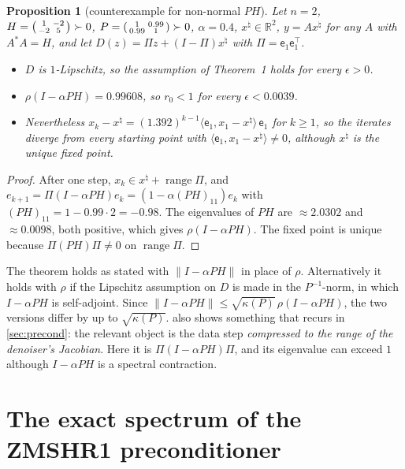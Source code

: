 \documentclass[11pt]{article}
\newtheorem{proposition}[theorem]{Proposition}
\theoremstyle{definition}
\theoremstyle{remark}
\newcommand{\RR}{\mathbb R}
\newcommand{\inner}[2]{\langle #1,#2\rangle}
\newcommand{\norm}[1]{\lVert #1\rVert}
\newcommand{\range}{\operatorname{range}}
\newcommand{\xt}{x^\natural}
\begin{document}
\begin{proposition}[counterexample for non-normal $PH$]\label{prop:counterexample}
Let $n=2$, $H=\begin{psmallmatrix}1&-2\\-2&5\end{psmallmatrix}\succ0$, $P=\begin{psmallmatrix}1&0.99\\0.99&1\end{psmallmatrix}\succ0$,
$\alpha=0.4$, $\xt\in\RR^2$, $y=A\xt$ for any $A$ with $A^*A=H$, and let $D(z)=\Pi z+(I-\Pi)\xt$ with
$\Pi=\mathsf e_1\mathsf e_1^\top$.
\begin{itemize}
\item $D$ is $1$-Lipschitz, so the assumption of Theorem~1 holds for every $\epsilon>0$.
\item $\rho(I-\alpha PH)=0.99608$, so $r_0<1$ for every $\epsilon<0.0039$.
\item Nevertheless $x_k-\xt=(1.392)^{k-1}\inner{\mathsf e_1}{x_1-\xt}\,\mathsf e_1$ for $k\geq1$, so the iterates diverge from every
  starting point with $\inner{\mathsf e_1}{x_1-\xt}\neq0$, although $\xt$ is the unique fixed point.
\end{itemize}
\end{proposition}
\begin{proof}
After one step, $x_k\in \xt+\range\Pi$, and $e_{k+1}=\Pi(I-\alpha PH)e_k=(1-\alpha(PH)_{11})e_k$ with
$(PH)_{11}=1-0.99\cdot2=-0.98$. The eigenvalues of $PH$ are $\approx2.0302$ and $\approx0.0098$, both positive,
which gives $\rho(I-\alpha PH)$. The fixed point is unique because $\Pi(PH)\Pi\neq0$ on $\range\Pi$.
\end{proof}

The theorem holds as stated with $\norm{I-\alpha PH}$ in place of $\rho$. Alternatively it holds with $\rho$ if the
Lipschitz assumption on $D$ is made in the $P^{-1}$-norm, in which $I-\alpha PH$ is self-adjoint. Since
$\norm{I-\alpha PH}\leq\sqrt{\kappa(P)}\,\rho(I-\alpha PH)$, the two versions differ by up to $\sqrt{\kappa(P)}$.
 also shows something that recurs in \cref{sec:precond}: the relevant object is the data
step \emph{compressed to the range of the denoiser's Jacobian}. Here it is $\Pi(I-\alpha PH)\Pi$, and its
eigenvalue can exceed $1$ although $I-\alpha PH$ is a spectral contraction.

\section{The exact spectrum of the ZMSHR1 preconditioner}\label{sec:zmshr1}
\end{document}
